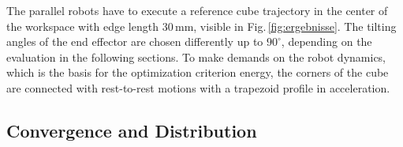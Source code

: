 \documentclass[fleqn,a4paper,10pt]{article}
\newcommand{\bm}[1]{\mathbf{#1}}
\newcommand{\transp}[0]{{\mathrm{T}}}
\begin{document}
\begin{multicols}{2}
The parallel robots have to execute a reference cube trajectory in the center of the workspace with edge length 30\,mm, visible in Fig.\,\ref{fig:ergebnisse}.
The tilting angles of the end effector are chosen differently up to $90^\circ$, depending on the evaluation in the following sections.
To make demands on the robot dynamics, which is the basis for the optimization criterion energy, the corners of the cube are connected with rest-to-rest motions with a  trapezoid profile in acceleration.




\subsection{Convergence and Distribution}
\label{sec:res_convergence}


\end{multicols}
\end{document}
